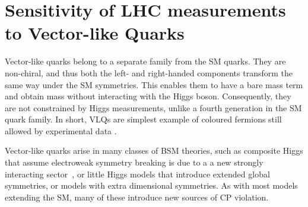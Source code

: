 \section{Sensitivity of LHC measurements to Vector-like Quarks}
\label{sec:VLQ}
Vector-like quarks belong to a separate family from the SM quarks. They are non-chiral, and thus both the left- and right-handed components transform the same way under the SM symmetries. This enables them to have a bare mass term and obtain mass without interacting with the Higgs boson. Consequently, they are not constrained by Higgs measurements, unlike a fourth generation in the SM quark family. In short, VLQs are simplest example of coloured fermions still allowed by experimental data \cite{Aguilar_Saavedra_2013}. 

Vector-like quarks arise in many classes of BSM theories, such as composite Higgs that assume electroweak symmetry breaking is due to a a new strongly interacting sector~\cite{witzel2019review}, or little Higgs models that introduce extended global symmetries, or models with extra dimensional symmetries. As with most models extending the SM, many of these introduce new sources of CP violation.

